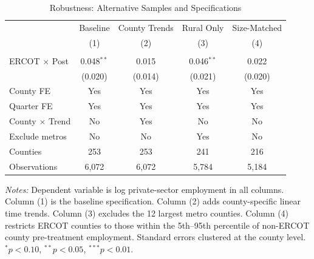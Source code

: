 \begin{table}[htbp]
\centering
\caption{Robustness: Alternative Samples and Specifications}
\label{tab:robustness}
\begin{tabular}{lcccc}
\hline\hline
 & Baseline & County Trends & Rural Only & Size-Matched \\
 & (1) & (2) & (3) & (4) \\
\hline
\\[-6pt]
ERCOT $\times$ Post & 0.048$^{**}$ & 0.015 & 0.046$^{**}$ & 0.022 \\
 & (0.020) & (0.014) & (0.021) & (0.020) \\[6pt]
\hline
County FE & Yes & Yes & Yes & Yes \\
Quarter FE & Yes & Yes & Yes & Yes \\
County $\times$ Trend & No & Yes & No & No \\
Exclude metros & No & No & Yes & No \\
Counties & 253 & 253 & 241 & 216 \\
Observations & 6,072 & 6,072 & 5,784 & 5,184 \\
\hline\hline
\end{tabular}
\begin{tablenotes}
\small
\item \textit{Notes:} Dependent variable is log private-sector employment in all columns. Column (1) is the baseline specification. Column (2) adds county-specific linear time trends. Column (3) excludes the 12 largest metro counties. Column (4) restricts ERCOT counties to those within the 5th--95th percentile of non-ERCOT county pre-treatment employment. Standard errors clustered at the county level. $^{*}p<0.10$, $^{**}p<0.05$, $^{***}p<0.01$.
\end{tablenotes}
\end{table}

